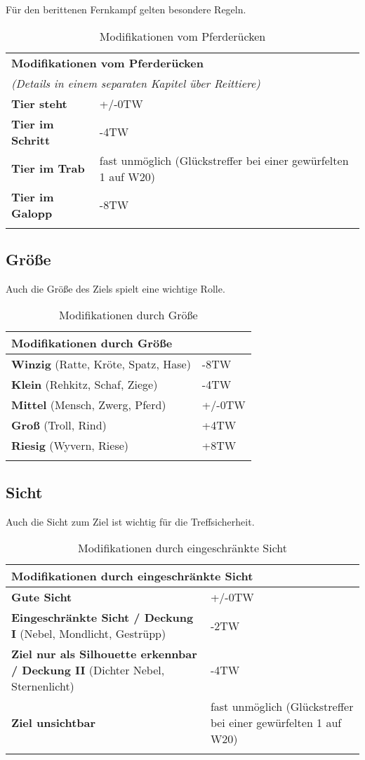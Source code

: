 Für den berittenen Fernkampf gelten besondere Regeln.

\begin{longtable}{|p{4cm}|p{7cm}|}
\hline
\multicolumn{2}{|l|}{\textbf{Modifikationen vom Pferderücken}} \\ 
\multicolumn{2}{|l|}{\textit{(Details in einem separaten Kapitel über Reittiere)}} \\ \hline
\textbf{Tier steht} & +/-0TW \\ \hline
\textbf{Tier im Schritt} & -4TW \\ \hline
\textbf{Tier im Trab} & fast unmöglich (Glückstreffer bei einer gewürfelten 1 auf W20) \\ \hline
\textbf{Tier im Galopp} & -8TW \\ \hline

\caption{Modifikationen vom Pferderücken}
\label{tab:PferderückenModifikationen}
\end{longtable}

\subsection{Größe}
Auch die Größe des Ziels spielt eine wichtige Rolle.

\begin{longtable}{|p{5cm}|p{6cm}|}
\hline
\multicolumn{2}{|l|}{\textbf{Modifikationen durch Grö{\ss}e}} \\ \hline
\textbf{Winzig} (Ratte, Kröte, Spatz, Hase) & -8TW \\ \hline
\textbf{Klein} (Rehkitz, Schaf, Ziege) & -4TW \\ \hline
\textbf{Mittel} (Mensch, Zwerg, Pferd) & +/-0TW \\ \hline
\textbf{Groß} (Troll, Rind) & +4TW \\ \hline
\textbf{Riesig} (Wyvern, Riese) & +8TW \\ \hline

\caption{Modifikationen durch Grö{\ss}e}
\label{tab:GrösseModifikationen}
\end{longtable}

\subsection{Sicht}
Auch die Sicht zum Ziel ist wichtig für die Treffsicherheit. 

\begin{longtable}{|p{5cm}|p{6cm}|}
\hline
\multicolumn{2}{|l|}{\textbf{Modifikationen durch eingeschränkte Sicht}} \\ \hline
\textbf{Gute Sicht} & +/-0TW \\ \hline
\textbf{Eingeschränkte Sicht / Deckung I} (Nebel, Mondlicht, Gestrüpp) & -2TW \\ \hline
\textbf{Ziel nur als Silhouette erkennbar / Deckung II} (Dichter Nebel, Sternenlicht) & -4TW \\ \hline
\textbf{Ziel unsichtbar} & fast unmöglich (Glückstreffer bei einer gewürfelten 1 auf W20) \\ \hline

\caption{Modifikationen durch eingeschränkte Sicht}
\label{tab:SichtModifikationen}
\end{longtable}


